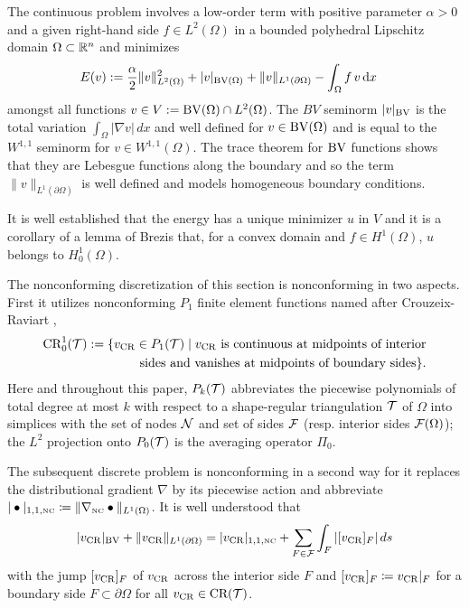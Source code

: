 The continuous problem involves a low-order term  with positive  parameter
$\alpha > 0$  and a given right-hand side  $f\in L^2(\Omega)$ in a bounded
polyhedral  Lipschitz domain 
$\Omega\subset \mathbb{R}^n$ and minimizes
\begin{align}\label{e:defEintro} 
  E(v)& :=    
  \frac{\alpha}{2} \|  v
  \|_{L^2(\Omega)}^2 + \lvert v\rvert_{\operatorname{BV}(\Omega)}
  + \| v \|_{L^1(\partial\Omega)}  -\int_\Omega f\, v\,\mathrm dx 
\end{align} amongst all
functions $v\in V:=\operatorname{BV}(\Omega)\cap L^2(\Omega)$.  The  $BV$ seminorm $\lvert
v\rvert_{\operatorname{BV}}$ is  the total variation $\int_\Omega |\nabla v|\, dx $ and
well defined for $v\in \operatorname{BV}(\Omega)$ and is equal to the $W^{1,1}$ seminorm
for $v\in W^{1,1}(\Omega)$. The trace theorem for $\operatorname{BV}$ functions shows that
they are Lebesgue functions along the boundary and so the  term $ \|  v
\|_{L^1(\partial\Omega)}$ is well defined and models homogeneous boundary
conditions. 

It is well established that the energy has a unique minimizer $u$ in $V$ and it
is a corollary of a lemma of Brezis that, for a convex domain and $f\in
H^1(\Omega)$,  $u$ belongs to $ H^1_0(\Omega)$.

The nonconforming discretization of this section is nonconforming in two
aspects. First it utilizes nonconforming $P_1$ finite element functions named
after Crouzeix-Raviart \cite{CrouzeixRaviart1973}, 
\begin{align*}
  {\operatorname{CR}}^1_0(\mathcal{T}):=\{v_{\operatorname{CR}}\in P_1(\mathcal{T})\;\vert\;v_{\operatorname{CR}} \text{ is continuous at midpoints of
  interior}\\ \text{sides and vanishes at midpoints of boundary sides}\}.
\end{align*} 
Here and throughout this paper,  $P_k(\mathcal{T})$ abbreviates the
piecewise polynomials of total degree at most $k$ with respect to a
shape-regular triangulation $\mathcal{T}$ of $\Omega$ into simplices with the set of
nodes $\mathcal{N}$ and set of sides $\mathcal{F}$ (resp. interior sides $\mathcal{F}(\Omega)$);  the
$L^2$ projection onto $P_0(\mathcal{T})$  is the averaging operator $\Pi_0$.
 

The subsequent discrete problem is nonconforming in a second way for
it replaces the distributional 
gradient $\nabla$ by its piecewise action 
and abbreviate
$|\bullet |_{1,1,{\textup{\tiny NC}}}\coloneqq
\|  \nabla_{\textup{\tiny NC}}\bullet\|_{L^1(\Omega)}$. 
It is well understood that 
\[
\lvert v_{\operatorname{CR}} \rvert_{\operatorname{BV}}+  \|  v_{\operatorname{CR}} \|_{L^1(\partial\Omega)} 
=   | v_{\operatorname{CR}}  |_{1,1,{\textup{\tiny NC}}} + \sum_{F\in\mathcal{F}} \int_F  | [v_{\operatorname{CR}}]_F|\, ds 
\]
with the jump  $[v_{\operatorname{CR}}]_F$ of $v_{\operatorname{CR}}$ across the interior side $F$ 
and $[v_{\operatorname{CR}}]_F \coloneqq v_{\operatorname{CR}}|_F$ for a boundary side $F\subset\partial\Omega$
for all $v_{\operatorname{CR}}\in \textup{CR}(\mathcal{T})$. 


